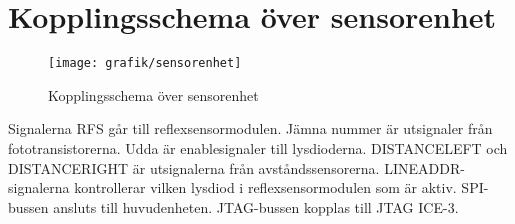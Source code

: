 \section{Kopplingsschema över sensorenhet}

\begin{figure}[h]
\center
\texttt{[image: grafik/sensorenhet]}
\caption{Kopplingsschema över sensorenhet}
\end{figure}

Signalerna RFS går till reflexsensormodulen. Jämna nummer är utsignaler från fototransistorerna. Udda är enablesignaler till lysdioderna. DISTANCELEFT och DISTANCERIGHT är utsignalerna från avståndssensorerna. LINEADDR-signalerna kontrollerar vilken lysdiod i reflexsensormodulen som är aktiv. SPI-bussen ansluts till huvudenheten. JTAG-bussen kopplas till JTAG ICE-3.
